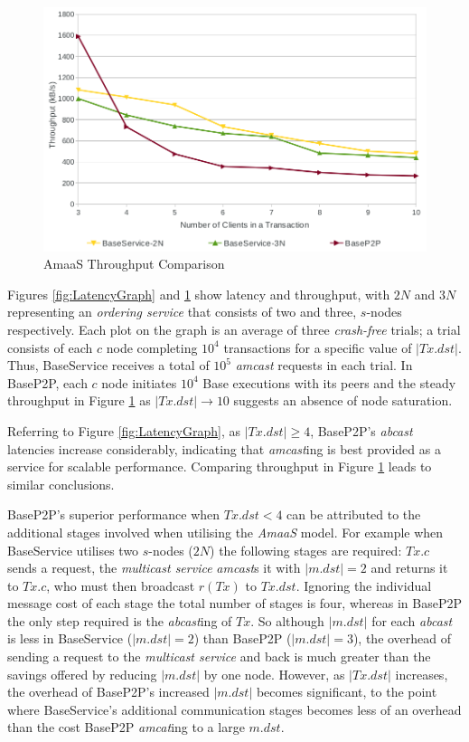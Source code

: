 \begin{figure}[htbp!]
 \includegraphics[width=\textwidth,height=\textheight,keepaspectratio]{Throughput}
 \caption{AmaaS Throughput Comparison}
 \label{fig:ThroughputGraph}
\end{figure}

Figures \ref{fig:LatencyGraph} and \ref{fig:ThroughputGraph} show latency and throughput, with $2N$ and $3N$ representing an \emph{ordering service} that consists of two and three, $s$-nodes respectively.  Each plot on the graph is an average of three \emph{crash-free} trials; a trial consists of each $c$ node completing $10^4$ transactions for a specific value of $|Tx.dst|$. Thus, BaseService receives a total of $10^5$ \emph{amcast} requests in each trial. In BaseP2P, each $c$ node initiates $10^4$ Base executions with its peers and the steady throughput in Figure \ref{fig:ThroughputGraph} as $|Tx.dst| \rightarrow 10$ suggests an absence of node saturation.

Referring to Figure \ref{fig:LatencyGraph}, as $|Tx.dst| \geq 4$, BaseP2P's \emph{abcast} latencies increase considerably, indicating that \emph{amcast}ing is best provided as a service for scalable performance. Comparing throughput in Figure \ref{fig:ThroughputGraph} leads to similar conclusions.  

BaseP2P's superior performance when $Tx.dst < 4$ can be attributed to the additional stages involved when utilising the \emph{AmaaS} model.  For example when BaseService utilises two $s$-nodes ($2N$) the following stages are required: $Tx.c$ sends a request, the \emph{multicast service} \emph{amcast}s it with $|m.dst| = 2$ and returns it to $Tx.c$, who must then broadcast $r(Tx)$ to $Tx.dst$.  Ignoring the individual message cost of each stage the total number of stages is four, whereas in BaseP2P the only step required is the \emph{abcast}ing of $Tx$.  So although $|m.dst|$ for each \emph{abcast} is less in BaseService ($|m.dst| = 2$) than BaseP2P ($|m.dst| = 3$), the overhead of sending a request to the \emph{multicast service} and back is much greater than the savings offered by reducing $|m.dst|$ by one node.  However, as $|Tx.dst|$ increases, the overhead of BaseP2P's increased $|m.dst|$ becomes significant, to the point where BaseService's additional communication stages becomes less of an overhead than the cost BaseP2P \emph{amcat}ing to a large $m.dst$.  

